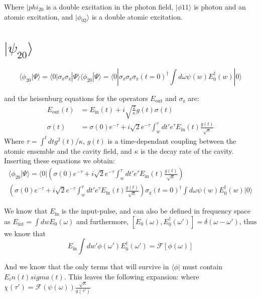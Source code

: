 \documentclass[12pt]{article}
\begin{document}
Where $| phi_{20}$ is a double excitation in the photon field, $| \phi{11} \rangle $ is photon and an atomic excitation, and $ | \phi_{02} \rangle $ is a double atomic excitation. 

\section{ $| \psi_{20} \rangle$}

\begin{equation}
\langle \phi_{20}| \Psi \rangle =\langle 0 | \sigma_\textrm{z} \sigma_\textrm{z} | \Psi \rangle
\langle \phi_{20}| \Psi \rangle =\langle 0 | \sigma_\textrm{z} \sigma_\textrm{z} 
\sigma_\textrm{z}(t=0)^\dagger \int d\omega \psi(w) E_0^\dagger(w) | 0 \rangle
\end{equation}

and the heisenburg equations for the operators $E_\textrm{out}$ and $\sigma_\textrm{z}$ are:
\begin{align}
E_\textrm{out}(t) &= E_\textrm{in}(t) + i \sqrt{\frac{2}{\kappa}} g(t) \sigma(t)\\
\sigma(t) &= \sigma(0) e^{-\tau} + i\sqrt{2} e^{-\tau} \int^\tau_w d t' e^\tau E_\textrm{in}(t) \frac{g(t)}{\sqrt{\kappa}}
\end{align}
Where $\tau = \int^t dt g^2(t)/\kappa$, $g(t)$ is a time-dependant coupling between the atomic ensemble and the cavity field, and $\kappa$ is the decay rate of the cavity. Inserting these equations we obtain:
\begin{multline}
\langle \phi_{20}| \Psi \rangle =\langle 0 | \left (  \sigma(0) e^{-\tau} + i\sqrt{2} e^{-\tau} \int^\tau_w d t' e^\tau E_\textrm{in}(t) \frac{g(t)}{\sqrt{\kappa}} \right )\\ \left ( \sigma(0) e^{-\tau} + i\sqrt{2} e^{-\tau} \int^\tau_w d t' e^\tau E_\textrm{in}(t) \frac{g(t)}{\sqrt{\kappa}} \right ) \sigma_\textrm{z}(t=0)^\dagger \int d\omega \psi(w) E_0^\dagger(w) | 0 \rangle
\end{multline}

We know that $E_\textrm{in}$ is the input-pulse, and can also be defined in frequency space as $E_\textrm{int} = \int dw E_0(\omega) $ and furthermore, $[E_0(\omega), E_0^\dagger(\omega') ] = \delta(\omega-\omega')$, thus we know that 
\begin{equation}
E_\textrm{in} \int dw' \phi(\omega') E_0^\dagger(\omega') = \mathscr{F}[\phi(\omega)]
\end{equation}

And we know that the only terms that will survive in $\langle \phi |$ must contain $E_in(t) sigma(t)$. This leaves the following expansion:
where $\chi(\tau') = \mathscr{F}(\psi(\omega)) \frac{\sqrt{\kappa}}{g(\tau')}$
\end{document}
